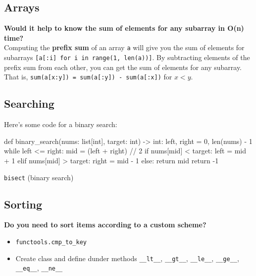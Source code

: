\documentclass[12pt]{article}
\begin{document}
\subsection*{Arrays}

\begin{adjustwidth}{2em}{0pt}
\textbf{Would it help to know the sum of elements for any subarray in O(n) time?} \\

Computing the \textbf{prefix sum} of an array \texttt{a} will give you the sum of elements for subarrays \texttt{[a[:i] for i in range(1, len(a))]}. By subtracting elements of the prefix sum from each other, you can get the sum of elements for any subarray. That is, \texttt{sum(a[x:y]) = sum(a[:y]) - sum(a[:x])} for $x < y$.
\end{adjustwidth}

\subsection*{Searching}

\begin{adjustwidth}{2em}{0pt}
Here's some code for a binary search:
\begin{python}
def binary_search(nums: list[int], target: int) -> int:
    left, right = 0, len(nums) - 1
    while left <= right:
        mid = (left + right) // 2
        if nums[mid] < target:
            left = mid + 1
        elif nums[mid] > target:
            right = mid - 1
        else:
            return mid
    return -1
\end{python}

\texttt{bisect} (binary search)
\end{adjustwidth}

\subsection*{Sorting}

\begin{adjustwidth}{2em}{0pt}
\textbf{Do you need to sort items according to a custom scheme?}
\begin{itemize}
  \item \texttt{functools.cmp\_to\_key} 
  \item Create class and define dunder methods \texttt{\_\_lt\_\_}, \texttt{\_\_gt\_\_}, \texttt{\_\_le\_\_}, \texttt{\_\_ge\_\_}, \texttt{\_\_eq\_\_}, \texttt{\_\_ne\_\_}
\end{itemize}
\end{adjustwidth}
\bigskip
\end{document}
